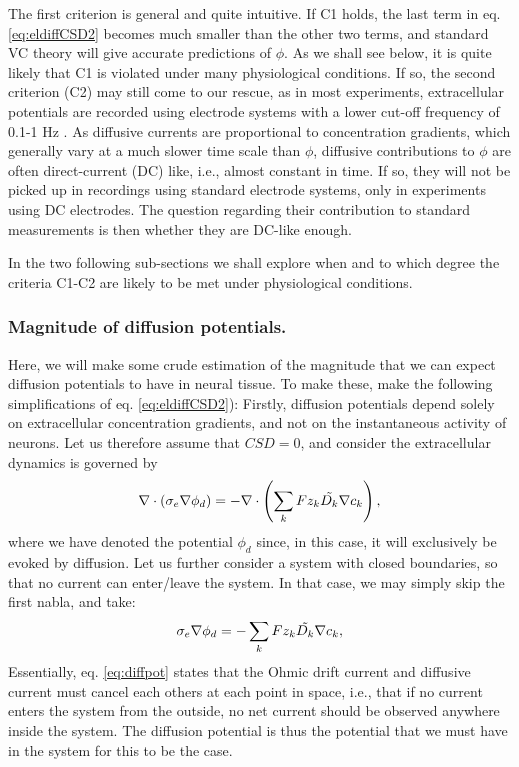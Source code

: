 The first criterion is general and quite intuitive. If C1 holds, the last term in eq. \ref{eq:eldiffCSD2} becomes much smaller than the other two terms, and standard VC theory will give accurate predictions of $\phi$. As we shall see below, it is quite likely that C1 is violated under many physiological conditions. If so, the second criterion (C2) may still come to our rescue, as in most experiments, extracellular potentials are recorded using electrode systems with a lower cut-off frequency of 0.1-1 Hz \cite{Einevoll2007}. As diffusive currents are proportional to concentration gradients, which generally vary at a much slower time scale than $\phi$, diffusive contributions to $\phi$ are often direct-current (DC) like, i.e., almost constant in time. If so, they will not be picked up in recordings using standard electrode systems, only in experiments using DC electrodes. The question regarding their contribution to standard measurements is then whether they are DC-like enough. 

In the two following sub-sections we shall explore when and to which degree the criteria C1-C2 are likely to be met under physiological conditions.

\subsubsection{Magnitude of diffusion potentials.}
Here, we will make some crude estimation of the magnitude that we can expect diffusion potentials to have in neural tissue. To make these, make the following simplifications of eq. \ref{eq:eldiffCSD2}): Firstly, diffusion potentials depend solely on extracellular concentration gradients, and not on the instantaneous activity of neurons. Let us therefore assume that $CSD = 0$, and consider the extracellular dynamics is governed by
\begin{equation}
\nabla \cdot (\sigma_e\nabla\phi_d) = - \nabla \cdot \left (\sum_k{F z_k \tilde{D_k}{\bf \nabla} c_{k}} \right), 
\label{eq:eldiffCSD3}
\end{equation}
where we have denoted the potential $\phi_d$ since, in this case, it will exclusively be evoked by diffusion. Let us further consider a system with closed boundaries, so that no current can enter/leave the system. In that case, we may simply skip the first nabla, and take:
\begin{equation}
\sigma_e\nabla\phi_d = -\sum_k{F z_k \tilde{D_k}{\bf \nabla} c_{k}}, 
\label{eq:diffpot}
\end{equation}
Essentially, eq. \ref{eq:diffpot} states that the Ohmic drift current and diffusive current must cancel each others at each point in space, i.e., that if no current enters the system from the outside, no net current should be observed anywhere inside the system. The diffusion potential is thus the potential that we must have in the system for this to be the case. 

